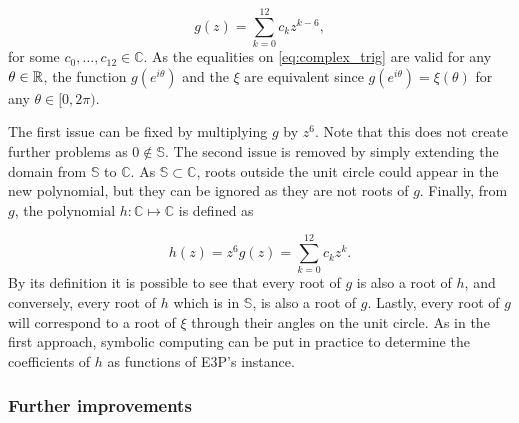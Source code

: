 \begin{equation}
g(z)=\sum_{k=0}^{12} c_k z^{k-6},
\end{equation}
for some $c_0, \dots, c_{12} \in \mathbb{C}$. As the equalities on \autoref{eq:complex_trig} are valid for any $\theta \in \mathbb{R}$, the function $g(e^{i\theta})$ and the $\xi$ are equivalent since $g(e^{i\theta}) = \xi(\theta)$ for any $\theta \in [0, 2\pi)$. 

The first issue can be fixed by multiplying $g$ by $z^6$. Note that this does not create further problems as $0\not\in \mathbb{S}$. The second issue is removed by simply extending the domain from $\mathbb{S}$ to $\mathbb{C}$. 
As $\mathbb{S} \subset \mathbb{C}$, roots outside the unit circle could appear in the new polynomial, but they can be ignored as they are not roots of $g$.
Finally, from $g$, the polynomial $h : \mathbb{C} \mapsto \mathbb{C}$ is defined as

\begin{equation}\label{eq:h}
h(z) = z^6 g(z) = \sum_{k=0}^{12} c_k z^k.
\end{equation}
By its definition it is possible to see that every root of $g$ is also a root of $h$, and conversely, every root of $h$ which is in $\mathbb{S}$, is also a root of $g$. Lastly, every root of $g$ will correspond to a root of $\xi$ through their angles on the unit circle. As in the first approach, symbolic computing can be put in practice to determine the coefficients of $h$ as functions of E3P's instance.

\subsubsection{Further improvements}

